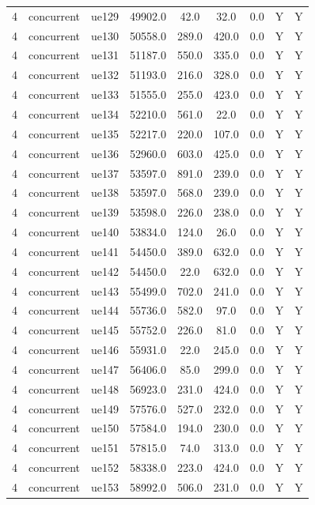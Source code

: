 \begin{table}[ht]
\begin{tabular}{|c|c|c|c|c|c|c|c|c|}
4 & concurrent & ue129 & 49902.0 & 42.0 & 32.0 & 0.0 & Y & Y \\
4 & concurrent & ue130 & 50558.0 & 289.0 & 420.0 & 0.0 & Y & Y \\
4 & concurrent & ue131 & 51187.0 & 550.0 & 335.0 & 0.0 & Y & Y \\
4 & concurrent & ue132 & 51193.0 & 216.0 & 328.0 & 0.0 & Y & Y \\
4 & concurrent & ue133 & 51555.0 & 255.0 & 423.0 & 0.0 & Y & Y \\
4 & concurrent & ue134 & 52210.0 & 561.0 & 22.0 & 0.0 & Y & Y \\
4 & concurrent & ue135 & 52217.0 & 220.0 & 107.0 & 0.0 & Y & Y \\
4 & concurrent & ue136 & 52960.0 & 603.0 & 425.0 & 0.0 & Y & Y \\
4 & concurrent & ue137 & 53597.0 & 891.0 & 239.0 & 0.0 & Y & Y \\
4 & concurrent & ue138 & 53597.0 & 568.0 & 239.0 & 0.0 & Y & Y \\
4 & concurrent & ue139 & 53598.0 & 226.0 & 238.0 & 0.0 & Y & Y \\
4 & concurrent & ue140 & 53834.0 & 124.0 & 26.0 & 0.0 & Y & Y \\
4 & concurrent & ue141 & 54450.0 & 389.0 & 632.0 & 0.0 & Y & Y \\
4 & concurrent & ue142 & 54450.0 & 22.0 & 632.0 & 0.0 & Y & Y \\
4 & concurrent & ue143 & 55499.0 & 702.0 & 241.0 & 0.0 & Y & Y \\
4 & concurrent & ue144 & 55736.0 & 582.0 & 97.0 & 0.0 & Y & Y \\
4 & concurrent & ue145 & 55752.0 & 226.0 & 81.0 & 0.0 & Y & Y \\
4 & concurrent & ue146 & 55931.0 & 22.0 & 245.0 & 0.0 & Y & Y \\
4 & concurrent & ue147 & 56406.0 & 85.0 & 299.0 & 0.0 & Y & Y \\
4 & concurrent & ue148 & 56923.0 & 231.0 & 424.0 & 0.0 & Y & Y \\
4 & concurrent & ue149 & 57576.0 & 527.0 & 232.0 & 0.0 & Y & Y \\
4 & concurrent & ue150 & 57584.0 & 194.0 & 230.0 & 0.0 & Y & Y \\
4 & concurrent & ue151 & 57815.0 & 74.0 & 313.0 & 0.0 & Y & Y \\
4 & concurrent & ue152 & 58338.0 & 223.0 & 424.0 & 0.0 & Y & Y \\
4 & concurrent & ue153 & 58992.0 & 506.0 & 231.0 & 0.0 & Y & Y \\

\end{tabular}
\end{table}
